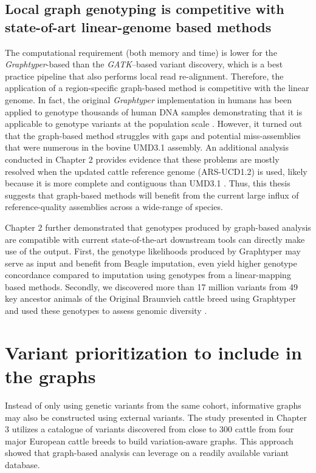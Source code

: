 \documentclass[../main.tex]{subfiles}
\begin{document}
\subsection*{Local graph genotyping is competitive with state-of-art linear-genome based methods}

The computational requirement (both memory and time) is lower for the \emph{Graphtyper}-based than the \emph{GATK}–based variant discovery, which is a best practice pipeline that also performs local read re-alignment. Therefore, the application of a region-specific graph-based method is competitive with the linear genome. In fact, the original \emph{Graphtyper} implementation in humans has been applied to genotype thousands of  human DNA samples demonstrating that it is applicable to genotype variants at the population scale \citep{eggertsson2017graphtyper,eggertsson2019graphtyper2}. However, it turned out that the graph-based method struggles with gaps and potential miss-assemblies that were numerous in the bovine UMD3.1 assembly. An additional analysis conducted in Chapter 2 provides evidence that these problems are mostly resolved when the updated cattle reference genome (ARS-UCD1.2) is used, likely because it is more complete and contiguous than UMD3.1 \citep{rice2020continuous}. Thus, this thesis suggests that graph-based methods will benefit from the current large influx of reference-quality assemblies across a wide-range of species. 

Chapter 2 further demonstrated that genotypes produced by graph-based analysis are compatible with current state-of-the-art downstream tools can directly make use of the output. First, the genotype likelihoods produced by Graphtyper may serve as input and benefit from Beagle imputation, even yield higher genotype concordance compared to imputation using genotypes from a linear-mapping based methods. Secondly, we discovered more than 17 million variants from 49 key ancestor animals of the Original Braunvieh cattle breed using Graphtyper and used these genotypes to assess genomic diversity \citep{bhati2020assessing}. 

\section{Variant prioritization to include in the graphs}

Instead of only using genetic variants from the same cohort, informative graphs may also be constructed using external variants. The study presented in Chapter 3 utilizes a catalogue of variants discovered from close to 300 cattle from four major European cattle breeds to build variation-aware graphs. This approach showed that graph-based analysis can leverage on a readily available variant database. 
\end{document}
